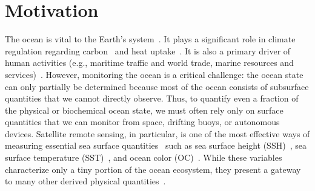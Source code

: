 \section{Motivation}

The ocean is vital to the Earth's system~\cite{OCEANWARMING}. 
It plays a significant role in climate regulation regarding carbon~\cite{OCEANCARBONCYCLE} and heat uptake~\cite{OCEANHEATUPTAKE}. It is also a primary driver of human activities (e.g., maritime traffic and world trade, marine resources and services)~\cite{SSHOPERATIONAL, ML4OCN}. 
However, monitoring the ocean is a critical challenge: the ocean state can only partially be determined because most of the ocean consists of subsurface quantities that we cannot directly observe. 
Thus, to quantify even a fraction of the physical or biochemical ocean state, we must often rely only on surface quantities that we can monitor from space, drifting buoys, or autonomous devices.
Satellite remote sensing, in particular, is one of the most effective ways of measuring essential sea surface quantities~\cite{Altimetry} such as sea surface height (SSH)~\cite{DUACS}, sea surface temperature (SST)~\cite{OCEANSATELLITESST}, and ocean color (OC)~\cite{OCEANSATELLITEOC}. 
While these variables characterize only a tiny portion of the ocean ecosystem, they present a gateway to many other derived physical quantities~\cite{ML4OCN}.


